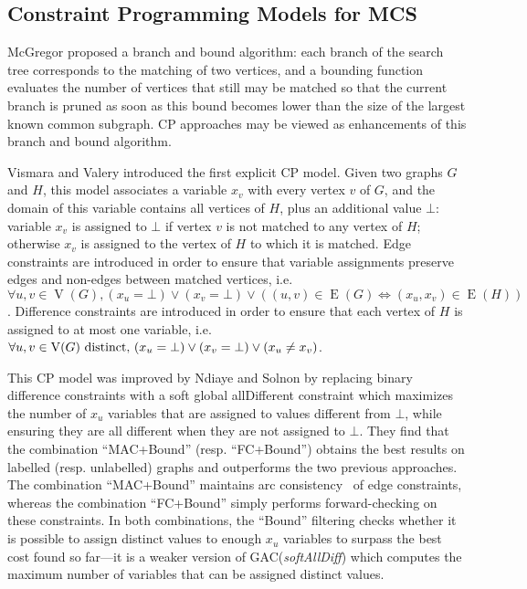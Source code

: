 \documentclass{llncs}
\begin{document}
\subsection{Constraint Programming Models for MCS} \label{CP}

McGregor \cite{McGreg82} proposed a branch and bound algorithm: each branch of the search tree
corresponds to the matching of two vertices, and a bounding function evaluates the number of
vertices that still may be matched so that the current branch is pruned as soon as this bound
becomes lower than the size of the largest known common subgraph. CP approaches may be viewed as
enhancements of this branch and bound algorithm.

Vismara and Valery  \cite{DBLP:conf/mco/VismaraV08} introduced the first explicit CP model. Given
two graphs $G$ and $H$, this model associates a variable $x_v$ with every vertex $v$ of $G$, and the
domain of this variable contains all vertices of $H$, plus an additional value $\bot$: variable
$x_v$ is assigned to $\bot$ if vertex $v$ is not matched to any vertex of $H$; otherwise $x_v$ is
assigned to the vertex of $H$ to which it is matched. Edge constraints are introduced in order to
ensure that variable assignments preserve edges and non-edges between matched vertices, i.e.\ $\forall u, v \in
\operatorname{V}(G), (x_u = \bot) \vee (x_v = \bot) \vee ((u, v) \in \operatorname{E}(G)
\Leftrightarrow (x_u, x_v) \in \operatorname{E}(H))$.  Difference constraints are introduced in
order to ensure that each vertex of $H$ is assigned to at most one variable, i.e.\ $\forall u, v \in
\operatorname{V}(G)~\textnormal{distinct,}~ (x_u = \bot) \vee (x_v = \bot) \vee (x_u \neq x_v)$.

This CP model was improved by Ndiaye and Solnon \cite{DBLP:conf/cp/NdiayeS11} by replacing binary
difference constraints with a soft global allDifferent constraint which maximizes the number of
$x_u$ variables that are assigned to values different from $\bot$, while ensuring they are all
different when they are not assigned to $\bot$. They find that the combination ``MAC+Bound'' (resp.
``FC+Bound'') obtains the best results on labelled (resp. unlabelled) graphs and outperforms the
two previous approaches. The combination ``MAC+Bound'' maintains arc consistency~\cite{sabi94} of
edge constraints, whereas the combination ``FC+Bound'' simply performs forward-checking on these
constraints. In both combinations, the ``Bound'' filtering checks whether it is possible to assign
distinct values to enough $x_u$ variables to surpass the best cost found so far---it is a weaker
version of GAC(\emph{softAllDiff}) \cite{peti01} which computes the maximum number of variables that
can be assigned distinct values.
\end{document}
